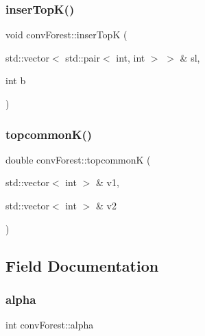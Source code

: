 \mbox{\label{classconvForest_a64930c8a4d1e1f74fc45f3ce5c24a55e}} 
\subsubsection{\texorpdfstring{inser\+Top\+K()}{inserTopK()}}
{\footnotesize\ttfamily void conv\+Forest\+::inser\+TopK (\begin{DoxyParamCaption}\item[{std\+::vector$<$ std\+::pair$<$ int, int $>$ $>$ \&}]{sl,  }\item[{int}]{b }\end{DoxyParamCaption})\hspace{0.3cm}{\ttfamily [private]}}

\mbox{\label{classconvForest_a650511b77be61f6c5766fcd6b577b33e}} 
\subsubsection{\texorpdfstring{topcommon\+K()}{topcommonK()}}
{\footnotesize\ttfamily double conv\+Forest\+::topcommonK (\begin{DoxyParamCaption}\item[{std\+::vector$<$ int $>$ \&}]{v1,  }\item[{std\+::vector$<$ int $>$ \&}]{v2 }\end{DoxyParamCaption})\hspace{0.3cm}{\ttfamily [private]}}



\subsection{Field Documentation}
\mbox{\label{classconvForest_a69ed3ccc19fa0439f9fb64ce28c3c66f}} 
\subsubsection{\texorpdfstring{alpha}{alpha}}
{\footnotesize\ttfamily int conv\+Forest\+::alpha\hspace{0.3cm}{\ttfamily [private]}}

